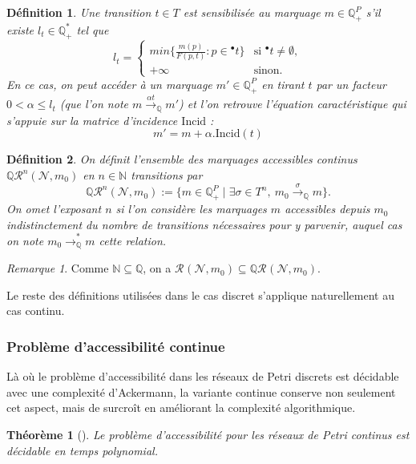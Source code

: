 \documentclass{article}
\newtheorem{definition}{Définition}
\newtheorem{theorem}{Théorème}
\theoremstyle{remark}
\newtheorem*{remark}{Remarque}
\theoremstyle{remark}
\newcommand{\preb}[1]{{}^\bullet #1}
\newcommand{\reach}[3][]{\mathcal{R}^{#1}(\mathcal{#2}, #3)}
\newcommand{\creach}[3][]{\mathbb{Q}\reach[#1]{#2}{#3}}
\newcommand{\reaches}[1][]{\xrightarrow{#1}}
\newcommand{\creaches}[1][]{\reaches[#1]_{\mathbb{Q}}}
\newcommand{\creachess}{\creaches^*}
\newcommand{\incid}{\mathrm{Incid}}
\begin{document}
\begin{definition}
    Une transition $t \in T$ est sensibilisée au marquage $m \in \mathbb{Q}_+^P$ s'il existe $l_t \in \mathbb{Q_+^*}$ tel que
    \[l_t = \begin{cases}
        min \{\frac{m(p)}{F(p, t)} : p \in \preb{t}\} & \text{si } \preb{t} \neq \emptyset, \\
        +\infty & \text{sinon.}
    \end{cases}\]
    En ce cas, on peut accéder à un marquage $m' \in \mathbb{Q}_+^P$ en tirant $t$ par un facteur $0 < \alpha \leq l_t$ (que l'on note $m \creaches[\alpha t] m'$) et l'on retrouve l'équation caractéristique qui s'appuie sur la matrice d'incidence $\incid$ : \[m' = m + \alpha.\incid(t)\]
\end{definition}

\begin{definition}
    On définit l'ensemble des marquages accessibles continus $\creach[n]{N}{m_0}$ en $n \in \mathbb{N}$ transitions par \[\creach[n]{N}{m_0} := \{m \in \mathbb{Q}_+^P \mid \exists \sigma \in T^n,\  m_0 \creaches[\sigma] m\}.\]
    On omet l'exposant $n$ si l’on considère les marquages $m$ accessibles depuis $m_0$ indistinctement du nombre de transitions nécessaires pour y parvenir, auquel cas on note $m_0 \creachess m$ cette relation.
\end{definition}

\begin{remark}
    Comme $\mathbb{N} \subseteq \mathbb{Q}$, on a $\reach{N}{m_0} \subseteq \mathbb{Q}\reach{N}{m_0}$.
\end{remark}

\noindent
Le reste des définitions utilisées dans le cas discret s'applique naturellement au cas continu.

\subsubsection{Problème d'accessibilité continue}

Là où le problème d'accessibilité dans les réseaux de Petri discrets est décidable avec une complexité d'Ackermann, la variante continue conserve non seulement cet aspect, mais de surcroît en améliorant la complexité algorithmique.

\begin{theorem}[]
    Le problème d'accessibilité pour les réseaux de Petri continus est décidable en temps polynomial.
\end{theorem}
\end{document}
